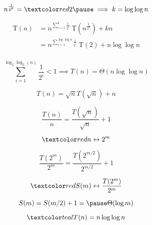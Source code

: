 \begin{frame}{}
  \[
    n^{\frac{1}{2^k}} = \red{2} \pause \implies k = \log\log n
  \]

  \pause
  \begin{align*} 
    \text{T}(n) &= n^{\sum_{i=1}^{k}\frac{1}{2^i}}\ \text{T}\left(n^{\frac{1}{2^k}}\right ) +kn\\ 
	    &=n^{\sum_{i=1}^{\log\log n}\frac{1}{2^i}}\ \text{T}(2) + n \log\log n\\ 
  \end{align*}

  \pause
  \[
    \sum_{i=1}^{\log_2\log_2(n)}\frac{1}{2^i} < 1 \implies T(n) = \Theta(n \log \log n)
  \]

  \pause
  \vspace{0.30cm}
  \centerline{}
\end{frame}

\begin{frame}{}
  \[
    \boxed{T(n) = \sqrt{n} T(\sqrt{n}) + n}
  \]

  \pause
  \[
    \frac{T(n)}{n} = \frac{T(\sqrt{n})}{\sqrt{n}} + 1
  \]

  \pause
  \[
    \red{n \leftrightarrow 2^m}
  \]

  \pause
  \[
    \frac{T(2^m)}{2^m} = \frac{T(2^{m/2})}{2^{m/2}} + 1
  \]

  \pause
  \[
    \red{S(m) \leftrightarrow \frac{T(2^m)}{2^m}}
  \]

  \pause
  \[
    S(m) = S(m/2) + 1 = \pause \Theta(\log m)
  \]

  \pause
  \vspace{-0.60cm}
  \[
    \teal{T(n) = n \log \log n}
  \]
\end{frame}
